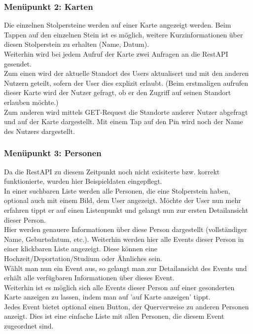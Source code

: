 \documentclass[a4paper, 11pt]{report}
\begin{document}
	\subsubsection{Menüpunkt 2: Karten}
	
	Die einzelnen Stolpersteine werden auf einer Karte angezeigt werden. Beim Tappen auf den einzelnen Stein ist es möglich, weitere Kurzinformationen über diesen Stolperstein zu erhalten (Name, Datum).\\
	Weiterhin wird bei jedem Aufruf der Karte zwei Anfragen an die RestAPI gesendet.\\
	Zum einen wird der aktuelle Standort des Users aktualisert und mit den anderen Nutzern geteilt, sofern der User dies explizit erlaubt. (Beim erstmaligen aufrufen dieser Karte wird der Nutzer gefragt, ob er den Zugriff auf seinen Standort erlauben möchte.)\\
	Zum anderen wird mittels GET-Request die Standorte anderer Nutzer abgefragt und auf der Karte dargestellt. Mit einem Tap auf den Pin wird noch der Name des Nutzers dargestellt.
	
	\subsubsection{Menüpunkt 3:  Personen }
	
	Da die RestAPI zu diesem Zeitpunkt noch nicht exisiterte bzw. korrekt funktionierte, wurden hier Beispieldaten eingepflegt.\\
	In einer suchbaren Liste werden alle Personen, die eine Stolperstein haben, optional auch mit einem Bild, dem User angezeigt. Möchte der User nun mehr erfahren tippt er auf einen Listenpunkt und gelangt nun zur ersten Detailansicht dieser Person.\\
	Hier werden genauere Informationen über diese Person dargestellt (vollständiger Name, Geburtsdatum, etc.). Weiterhin werden hier alle Events dieser Person in einer klickbaren Liste angezeigt. Diese können eine Hochzeit/Deportation/Studium oder Ähnliches sein. \\
	Wählt man nun ein Event aus, so gelangt man zur Detailansicht des Events und erhält alle verfügbaren Informationen über dieses Event.\\
	Weiterhin ist es möglich sich alle Events dieser Person auf einer gesonderten Karte anzeigen zu lassen, indem man auf 'auf Karte anzeigen' tippt.\\
	Jedes Event bietet optional einen Button, der Querverweise zu anderen Personen anzeigt. Dies ist eine einfache Liste mit allen Personen, die diesem Event zugeordnet sind.
	
\end{document}
